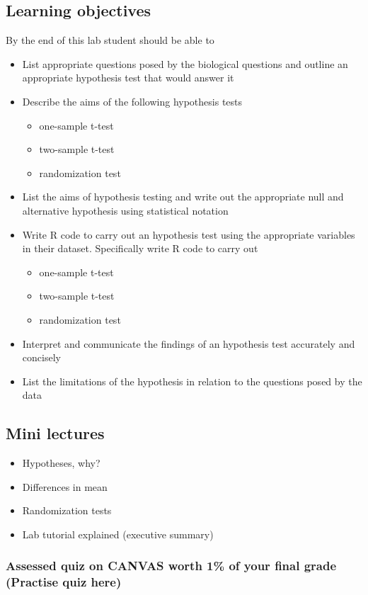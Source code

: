 \documentclass{article}
\begin{document}
\subsection*{Learning objectives}
By the end of this lab student should be able to
\begin{itemize}
\item List appropriate questions posed by the biological questions and  outline an appropriate hypothesis test that would answer it
\item Describe the aims of the following hypothesis tests
  \begin{itemize}
  \item one-sample t-test
  \item two-sample t-test
  \item randomization test
  \end{itemize}
\item List the aims of hypothesis testing and write out the appropriate null and alternative hypothesis using statistical notation
\item Write R code to carry out an hypothesis test using the appropriate variables in their dataset. Specifically write R code to carry out
  \begin{itemize}
  \item one-sample t-test
  \item two-sample t-test
  \item randomization test
  \end{itemize}
\item Interpret and communicate the findings of an hypothesis test accurately and concisely
\item List the limitations of the hypothesis in relation to the questions posed by the data
\end{itemize}

\subsection*{Mini lectures}

\begin{itemize}
\item Hypotheses, why?
\item Differences in mean
\item Randomization tests
\item Lab tutorial explained (executive summary)
\end{itemize}

\subsubsection*{Assessed quiz on CANVAS worth 1\% of your final grade (Practise quiz here)}
\end{document}
